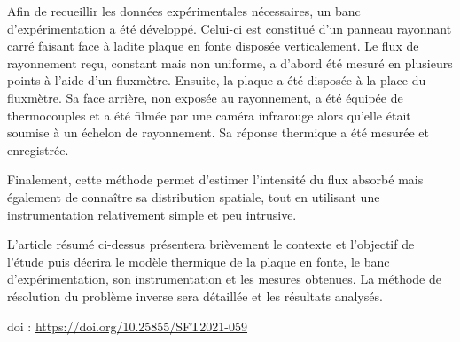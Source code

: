 {Afin de recueillir les données expérimentales nécessaires, un banc d'expérimentation a été développé. Celui-ci est constitué d'un panneau rayonnant carré faisant face à ladite plaque en fonte disposée verticalement. Le flux de rayonnement reçu, constant mais non uniforme, a d'abord été mesuré en plusieurs points à l'aide d'un fluxmètre. Ensuite, la plaque a été disposée à la place du fluxmètre. Sa face arrière, non exposée au rayonnement, a été équipée de thermocouples et a été filmée par une caméra infrarouge alors qu'elle était soumise à un échelon de rayonnement. Sa réponse thermique a été mesurée et enregistrée.







Finalement, cette méthode permet d'estimer l'intensité du flux absorbé mais également de connaître sa distribution spatiale, tout en utilisant une instrumentation relativement simple et peu intrusive.







L'article résumé ci-dessus présentera brièvement le contexte et l'objectif de l'étude puis décrira le modèle thermique de la plaque en fonte, le banc d'expérimentation, son instrumentation et les mesures obtenues. La méthode de résolution du problème inverse sera détaillée et les résultats analysés.

 \vfill doi : \url{https://doi.org/10.25855/SFT2021-059}

}
 
